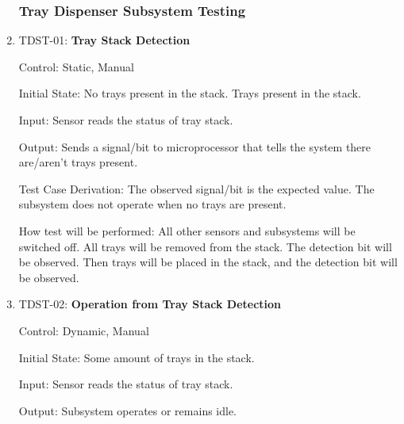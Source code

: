 \documentclass[12pt, titlepage]{article}
\begin{document}
\begin{enumerate}






\subsubsection{Tray Dispenser Subsystem Testing}
        
  \item{TDST-01: \textbf{Tray Stack Detection}}
  
  Control: Static, Manual
            
  Initial State: No trays present in the stack. Trays present in the stack.
            
  Input: Sensor reads the status of tray stack.
            
  Output: Sends a signal/bit to microprocessor that tells the system there are/aren't trays present.
   
  
  Test Case Derivation: The observed signal/bit is the expected value. The subsystem does not operate when no trays are present.
  
  How test will be performed: All other sensors and subsystems will be switched off. 
  All trays will be removed from the stack. The detection bit will be observed. 
  Then trays will be placed in the stack, and the detection bit will be observed.
\\
  \item{TDST-02: \textbf{Operation from Tray Stack Detection}}
  
  Control: Dynamic, Manual
            
  Initial State: Some amount of trays in the stack.
            
  Input: Sensor reads the status of tray stack.
            
  Output: Subsystem operates or remains idle.
  

\end{enumerate}
\end{document}

